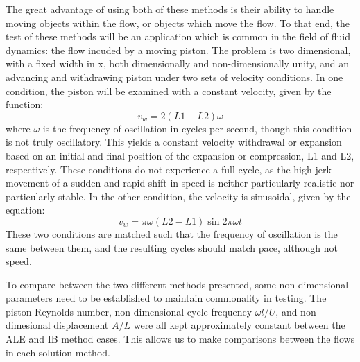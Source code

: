 \documentclass{article}
\begin{document}
The great advantage of using both of these methods is their ability to handle moving objects within the flow, or objects which move the flow.  To that end, the test of these methods will be an application which is common in the field of fluid dynamics: the flow incuded by a moving piston.  The problem is two dimensional, with a fixed width in x, both dimensionally and non-dimensionally unity, and an advancing and withdrawing piston under two sets of velocity conditions.  In one condition, the piston will be examined with a constant velocity, given by the function:
\begin{equation}
  v_w = 2 (L1-L2) \omega
\end{equation}
where $\omega$ is the frequency of oscillation in cycles per second, though this condition is not truly oscillatory.  This yields a constant velocity withdrawal or expansion based on an initial and final position of the expansion or compression, L1 and L2, respectively.  These conditions do not experience a full cycle, as the high jerk movement of a sudden and rapid shift in speed is neither particularly realistic nor particularly stable.  In the other condition, the velocity is sinusoidal, given by the equation:
\begin{equation}
  v_w = \pi \omega (L2-L1) \sin{2 \pi \omega t}
\end{equation}
These two conditions are matched such that the frequency of oscillation is the same between them, and the resulting cycles should match pace, although not speed.  

To compare between the two different methods presented, some non-dimensional parameters need to be established to maintain commonality in testing.  The piston Reynolds number, non-dimensional cycle frequency $\omega l/U$, and non-dimesional displacement $A/L$ were all kept approximately constant between the ALE and IB method cases.  This allows us to make comparisons between the flows in each solution method.
\end{document}
